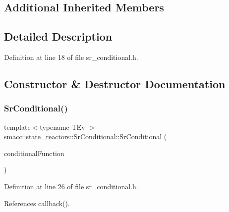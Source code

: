 \subsection*{Additional Inherited Members}


\subsection{Detailed Description}


Definition at line 18 of file sr\+\_\+conditional.\+h.



\subsection{Constructor \& Destructor Documentation}
\mbox{\label{classsmacc_1_1state__reactors_1_1SrConditional_ab89bc8f9d29e8a614eb6618af8596402}} 
\subsubsection{\texorpdfstring{Sr\+Conditional()}{SrConditional()}}
{\footnotesize\ttfamily template$<$typename T\+Ev $>$ \\
smacc\+::state\+\_\+reactors\+::\+Sr\+Conditional\+::\+Sr\+Conditional (\begin{DoxyParamCaption}\item[{std\+::function$<$ \hyperlink{classbool}{bool}(T\+Ev $\ast$)$>$}]{conditional\+Function }\end{DoxyParamCaption})\hspace{0.3cm}{\ttfamily [inline]}}



Definition at line 26 of file sr\+\_\+conditional.\+h.



References callback().


